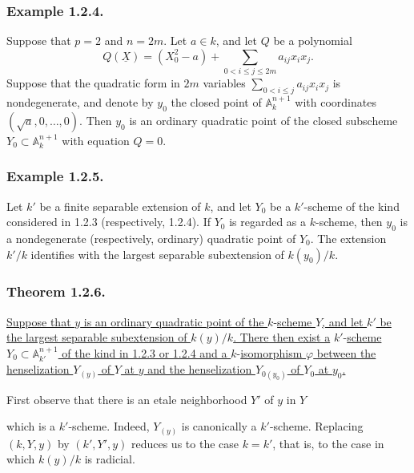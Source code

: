 \subsubsection*{Example 1.2.4.}
Suppose that $p=2$ and $n=2m$.  Let $a\in k$, and let $Q$ be a
polynomial
\[
Q(\underline X)=(X_0^2-a)
 +\sum_{0<i\leq j\leq2m}a_{ij}x_ix_j.
\]
Suppose that the quadratic form in $2m$ variables
$\sum_{0<i\leq j}a_{ij}x_ix_j$ is nondegenerate, and denote by $y_0$
the closed point of $\mathbb A_k^{n+1}$ with coordinates
$(\sqrt a,0,\ldots,0)$.  Then $y_0$ is an ordinary quadratic point
of the closed subscheme $Y_0\subset\mathbb A_k^{n+1}$ with equation
$Q=0$.

\subsubsection*{Example 1.2.5.}
Let $k'$ be a finite separable extension of $k$, and let $Y_0$ be a
$k'$-scheme of the kind considered in 1.2.3 (respectively, 1.2.4).
If $Y_0$ is regarded as a $k$-scheme, then $y_0$ is a nondegenerate
(respectively, ordinary) quadratic point of $Y_0$.  The extension
$k'/k$ identifies with the largest separable subextension of
$k(y_0)/k$.

\subsubsection*{Theorem 1.2.6.}
\underline{Suppose that $y$ is an ordinary quadratic point of the
}$k$-\underline{scheme $Y$, and let $k'$ be the largest separable subextension
of $k(y)/k$.  There then exist a} $k'$-\underline{scheme
$Y_0\subset\mathbb A_{k'}^{n+1}$ of the kind in 1.2.3 or 1.2.4 and a
}$k$-\underline{isomorphism $\varphi$ between the henselization $Y_{(y)}$ of $Y$
at $y$ and the henselization $Y_{0(y_0)}$ of $Y_0$ at $y_0$.}

First observe that there is an etale neighborhood $Y'$ of $y$ in
$Y$
\begin{center}
\end{center}
which is a $k'$-scheme.  Indeed, $Y_{(y)}$ is canonically a
$k'$-scheme.  Replacing $(k,Y,y)$ by $(k',Y',y)$ reduces us to the
case $k=k'$, that is, to the case in which $k(y)/k$ is radicial.
